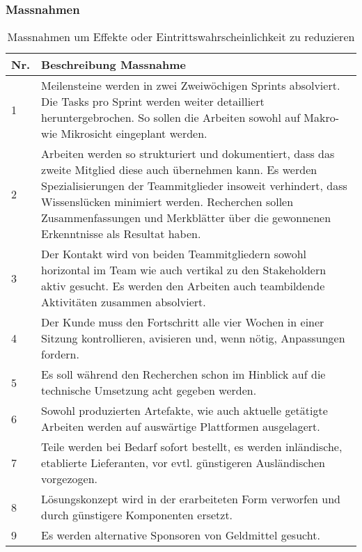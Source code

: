 \newpage

\subsubsection{Massnahmen}

\begin{table}[htb]
	\begin{tabularx}{\textwidth}{|l|X|}
		\hline
		\textbf{Nr.} & \textbf{Beschreibung Massnahme} \\
		\hline
		1 & Meilensteine werden in zwei Zweiwöchigen Sprints absolviert. Die Tasks pro Sprint werden weiter detailliert heruntergebrochen. So sollen die Arbeiten sowohl auf Makro- wie Mikrosicht eingeplant werden. \\
		\hline
		2 & Arbeiten werden so strukturiert und dokumentiert, dass das zweite Mitglied diese auch übernehmen kann. Es werden Spezialisierungen der Teammitglieder insoweit verhindert, dass Wissenslücken minimiert werden. Recherchen sollen Zusammenfassungen und Merkblätter über die gewonnenen Erkenntnisse als Resultat haben.\\
		\hline
		3 & Der Kontakt wird von beiden Teammitgliedern sowohl horizontal im Team wie auch vertikal zu den Stakeholdern aktiv gesucht. Es werden den Arbeiten auch teambildende Aktivitäten zusammen absolviert.\\
		\hline
		4 & Der Kunde muss den Fortschritt alle vier Wochen in einer Sitzung kontrollieren, avisieren und, wenn nötig, Anpassungen fordern.\\
		\hline
		5 & Es soll während den Recherchen schon im Hinblick auf die technische Umsetzung acht gegeben werden.\\
		\hline
		6 & Sowohl produzierten Artefakte, wie auch aktuelle getätigte Arbeiten werden auf auswärtige Plattformen ausgelagert.\\
		\hline
		7 & Teile werden bei Bedarf sofort bestellt, es werden inländische, etablierte Lieferanten, vor evtl. günstigeren Ausländischen vorgezogen.\\
		\hline
		8 & Lösungskonzept wird in der erarbeiteten Form verworfen und durch günstigere Komponenten ersetzt.\\
		\hline
		9 & Es werden alternative Sponsoren von Geldmittel gesucht.\\
		\hline
	\end{tabularx}
	\caption{Massnahmen um Effekte oder Eintrittswahrscheinlichkeit zu reduzieren}
\end{table}

